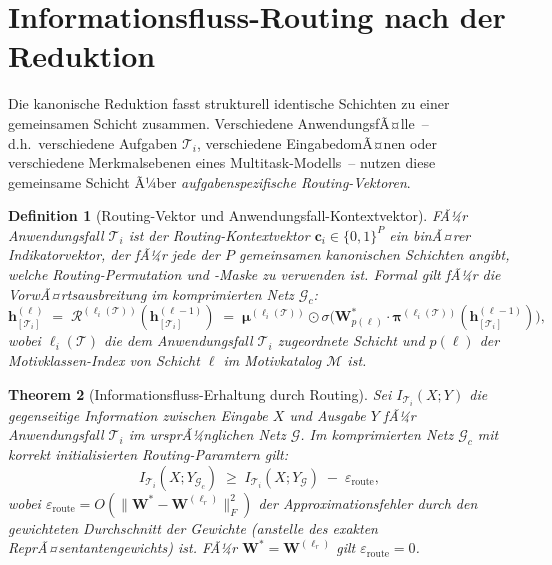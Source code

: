 ﻿\documentclass[12pt, a4paper, openany]{report}
\newtheorem{theorem}{Theorem}[chapter]
\newtheorem{definition}[theorem]{Definition}
\newcommand{\calG}{\mathcal{G}}
\newcommand{\calR}{\mathcal{R}}
\newcommand{\calM}{\mathcal{M}}
\newcommand{\eps}{\varepsilon}
\begin{document}
\section{Informationsfluss-Routing nach der Reduktion}
\label{sec:sgkr_routing}

Die kanonische Reduktion fasst strukturell identische Schichten zu einer
gemeinsamen Schicht zusammen.  Verschiedene AnwendungsfÃ¤lle~-- d.h.\
verschiedene Aufgaben $\mathcal{T}_i$, verschiedene EingabedomÃ¤nen oder
verschiedene Merkmalsebenen eines Multitask-Modells~-- nutzen diese
gemeinsame Schicht Ã¼ber \emph{aufgabenspezifische Routing-Vektoren}.

\begin{definition}[Routing-Vektor und Anwendungsfall-Kontextvektor]
\label{def:routing_vec}
FÃ¼r Anwendungsfall $\mathcal{T}_i$ ist der \emph{Routing-Kontextvektor}
$\bm{c}_i \in \{0,1\}^P$ ein binÃ¤rer Indikator\-vektor, der fÃ¼r jede der
$P$ gemeinsamen kanonischen Schichten angibt, welche Routing-Permutation
und -Maske zu verwenden ist.  Formal gilt fÃ¼r die VorwÃ¤rtsausbreitung
im komprimierten Netz $\calG_c$:
\begin{equation}
  \label{eq:forward_routed}
  \bm{h}^{(\ell)}_{[\mathcal{T}_i]}
  \;=\;
  \calR^{(\ell_i(\mathcal{T}))}(\bm{h}^{(\ell-1)}_{[\mathcal{T}_i]})
  \;=\;
  \bm{\mu}^{(\ell_i(\mathcal{T}))} \odot
  \sigma\!\bigl(\bm{W}^*_{p(\ell)} \cdot \bm{\pi}^{(\ell_i(\mathcal{T}))}(\bm{h}^{(\ell-1)}_{[\mathcal{T}_i]})\bigr),
\end{equation}
wobei $\ell_i(\mathcal{T})$ die dem Anwendungsfall $\mathcal{T}_i$ zugeordnete
Schicht und $p(\ell)$ der Motivklassen-Index von Schicht $\ell$ im
Motivkatalog $\calM$ ist.
\end{definition}

\begin{theorem}[Informationsfluss-Erhaltung durch Routing]
\label{thm:info_routing}
Sei $I_{\mathcal{T}_i}(X; Y)$ die gegenseitige Information zwischen
Eingabe $X$ und Ausgabe $Y$ fÃ¼r Anwendungsfall $\mathcal{T}_i$ im
ursprÃ¼nglichen Netz $\calG$.  Im komprimierten Netz $\calG_c$ mit
korrekt initiali\-sierten Routing-Paramtern gilt:
\begin{equation}
  \label{eq:mi_preservation}
  I_{\mathcal{T}_i}(X; Y_{\calG_c})
  \;\geq\;
  I_{\mathcal{T}_i}(X; Y_\calG)
  \;-\;
  \eps_{\mathrm{route}},
\end{equation}
wobei $\eps_{\mathrm{route}} = O(\|\bm{W}^* - \bm{W}^{(\ell_r)}\|_F^2)$ der
Approximationsfehler durch den gewichteten Durchschnitt der Gewichte
(anstelle des exakten ReprÃ¤sentanten\-gewichts) ist.  FÃ¼r $\bm{W}^* = \bm{W}^{(\ell_r)}$
gilt $\eps_{\mathrm{route}} = 0$.
\end{theorem}
\end{document}

